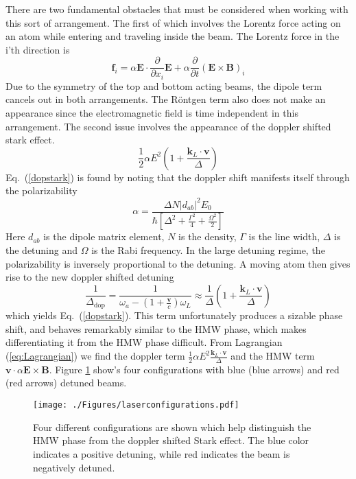 There are two fundamental obstacles that must be considered when working with this sort of arrangement.  The first of which involves the Lorentz force acting on an atom while entering and traveling inside the beam.  The Lorentz force in the i'th direction is
\begin{equation}
\mathbf{f}_i= \alpha\mathbf{E}\cdot\frac{\partial}{\partial x_i}\mathbf{E}+\alpha\frac{\partial}{\partial t}\left(\mathbf{E}\times\mathbf{B}\right)_i
\label{lorentz4}
\end{equation}
Due to the symmetry of the top and bottom acting beams, the dipole term cancels out in both arrangements. The R\"{o}ntgen term also does not make an appearance since the electromagnetic field is time independent in this arrangement.  
The second issue involves the appearance of the doppler shifted stark effect.   
\begin{equation}
\frac{1}{2}\alpha E^2\left(1+\frac{\mathbf{k}_L\cdot \mathbf{v}}{\Delta}\right)
\label{dopstark}
\end{equation}
Eq.\ (\ref{dopstark}) is found by noting that the doppler shift manifests itself through the polarizability \cite{cohentannoudjibook}
\begin{equation}
\alpha = \frac{\Delta N |d_{ab}|^2 E_0}{\hbar\left[\Delta^2 +\frac{\Gamma^2}{4}+\frac{\Omega^2}{2}\right]}
\end{equation}
Here $d_{ab}$ is the dipole matrix element, $N$ is the density, $\Gamma$ is the line width, $\Delta$ is the detuning and $\Omega$ is the Rabi frequency.  In the large detuning regime, the polarizability is inversely proportional to the detuning.  A moving atom then gives rise to the new doppler shifted detuning 
\begin{equation}
\frac{1}{\Delta_{\mathrm{dop}}}= \frac{1}{\omega_a-\left(1+\frac{\mathbf{v}}{c}\right)\omega_L}\approx \frac{1}{\Delta}\left(1+\frac{\mathbf{k}_L\cdot \mathbf{v}}{\Delta}\right)
\end{equation}
which yields Eq.\ (\ref{dopstark}).  This term unfortunately produces a sizable phase shift, and behaves remarkably similar to the HMW phase, which makes differentiating it from the HMW phase difficult. From Lagrangian (\ref{eq:Lagrangian}) we find the doppler term $\frac{1}{2}\alpha E^2 \frac{\mathbf{k}_L\cdot \mathbf{v}}{\Delta}$ and the HMW term $\mathbf{v}\cdot{\alpha \mathbf{E}\times\mathbf{B}}$. Figure \ref{fig:config} show's four configurations with blue (blue arrows) and red (red arrows) detuned beams.  
\begin{figure}[htp]
\texttt{[image: ./Figures/laserconfigurations.pdf]}
\caption{Four different configurations are shown which help distinguish the HMW phase from the doppler shifted Stark effect. The blue color indicates a positive detuning, while red indicates the beam is negatively detuned.} 
\label{fig:config}
\end{figure}
